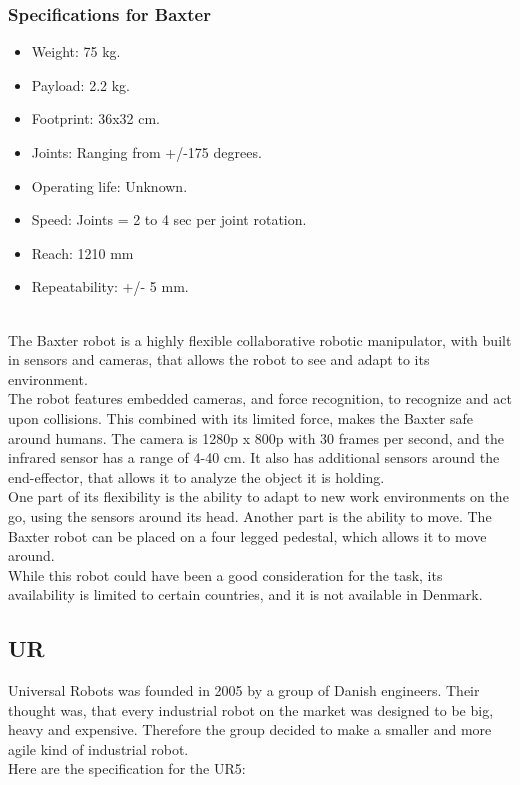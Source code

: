 \subsubsection{Specifications for Baxter}
\begin{itemize}
    \item Weight: 75 kg.
    \item Payload: 2.2 kg.
    \item Footprint: 36x32 cm.
    \item Joints: Ranging from +/-175 degrees.
    \item Operating life: Unknown.
    \item Speed: Joints = 2 to 4 sec per joint rotation.
    \item Reach: 1210 mm
    \item Repeatability: +/- 5 mm.
\end{itemize}
\cite{Rethinkspec}
\\
The Baxter robot is a highly flexible collaborative robotic manipulator, with built in sensors and cameras, that allows the robot to see and adapt to its environment.\\
The robot features embedded cameras, and force recognition, to recognize and act upon collisions. This combined with its limited force, makes the Baxter safe around humans.
The camera is 1280p x 800p with 30 frames per second, and the infrared sensor has a range of 4-40 cm. 
It also has additional sensors around the end-effector, that allows it to analyze the object it is holding. \\
One part of its flexibility is the ability to adapt to new work environments on the go, using the sensors around its head. Another part is the ability to move. The Baxter robot can be placed on a four legged pedestal, which allows it to move around. \\
While this robot could have been a good consideration for the task, its availability is limited to certain countries, and it is not available in Denmark\cite{rethinkbaxter}.

\subsection{UR}

Universal Robots was founded in 2005 by a group of Danish engineers. Their thought was, that every industrial robot on the market was designed to be big, heavy and expensive. Therefore the group decided to make a smaller and more agile kind of industrial robot.\cite{Urhist}\\
Here are the specification for the UR5:\\ 

